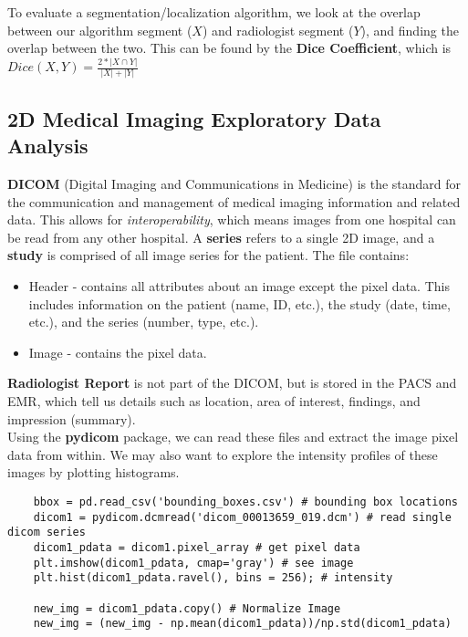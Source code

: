 \documentclass[11pt, a4paper]{article}
\begin{document}
	
	\noindent To evaluate a segmentation/localization algorithm, we look at the overlap between our algorithm segment ($X$) and radiologist segment ($Y$), and finding the overlap between the two. This can be found by the \textbf{Dice Coefficient}, which is $Dice(X,Y) = \frac{2* |X \cap Y|}{|X| + |Y|}$ 
	
	\subsection{2D Medical Imaging Exploratory Data Analysis}
	\textbf{DICOM} (Digital Imaging and Communications in Medicine) is the standard for the communication and management of medical imaging information and related data. This allows for \textit{interoperability}, which means images from one hospital can be read from any other hospital. A \textbf{series} refers to a single 2D image, and a \textbf{study} is comprised of all image series for the patient. The file contains:
	\begin{itemize}
		\item Header - contains all attributes about an image except the pixel data. This includes information on the patient (name, ID, etc.), the study (date, time, etc.), and the series (number, type, etc.).
		\item Image - contains the pixel data.
	\end{itemize}
	\textbf{Radiologist Report} is not part of the DICOM, but is stored in the PACS and EMR, which tell us details such as location, area of interest, findings, and impression (summary). \vspace*{3mm}\\
	Using the \textbf{pydicom} package, we can read these files and extract the image pixel data from within. We may also want to explore the intensity profiles of these images by plotting histograms. \vspace*{1mm}
	\begin{lstlisting}
	bbox = pd.read_csv('bounding_boxes.csv') # bounding box locations
	dicom1 = pydicom.dcmread('dicom_00013659_019.dcm') # read single dicom series
	dicom1_pdata = dicom1.pixel_array # get pixel data
	plt.imshow(dicom1_pdata, cmap='gray') # see image
	plt.hist(dicom1_pdata.ravel(), bins = 256); # intensity
	
	new_img = dicom1_pdata.copy() # Normalize Image
	new_img = (new_img - np.mean(dicom1_pdata))/np.std(dicom1_pdata)\end{lstlisting} \vspace*{1mm}
\end{document}
